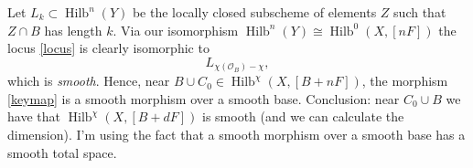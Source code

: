 \documentclass{amsart}
\theoremstyle{definition}
\renewcommand{\O}{\mathcal{O}}
\newcommand{\Hilb}{\operatorname{Hilb}}
\begin{document}
Let $L_k \subset \Hilb^n(Y)$ be the locally closed subscheme of elements $Z$ such that $Z \cap B$ has length $k$. Via our isomorphism $\Hilb^n(Y) \cong \Hilb^0(X,[nF])$ the locus \eqref{locus} is clearly isomorphic to 
$$
L_{\chi(\O_B) - \chi},
$$
which is \emph{smooth}. Hence, near $B \cup C_0 \in \Hilb^\chi(X,[B+nF])$, the morphism \eqref{keymap} is a smooth morphism over a smooth base. Conclusion: near $C_0 \cup B$ we have that $\Hilb^\chi(X,[B+dF])$ is smooth (and we can calculate the dimension). I'm using the fact that a smooth morphism over a smooth base has a smooth total space.

\begin{comment}

\pgfplotsset{ticks=none}

\begin{figure}
\centering
\begin{tikzpicture}
\begin{axis}
\addplot3+ [hide axis, domain=-5:5, samples=100, samples y=0,no marks, smooth,color=red,thick] ({-exp(-x^2)},{x},{0});
\addplot3+ [hide axis, domain=-5:5, samples=100, samples y=0,no marks, smooth,color=red,thick] ({-exp(-x^2)+5},{x},{0});
\addplot3+[hide axis, domain=-1.9:1.9, samples=100, samples y=0,no marks, smooth,color=red,thick] ({x^2-1+10},{x*(x^2-1)},{0});
\addplot3+[hide axis, domain=-1.9:1.9, samples=100, samples y=0,no marks, smooth,color=red,thick] ({x^2-1+15},{x*(x^2-1)},{0});
\addplot3+[hide axis, domain=-2:22, samples=100, samples y=0,no marks, smooth,color=red,thick] ({x},{-4},{0});
\addplot3 [mark=none,color=blue,thick] coordinates {(0,5,0) (2,5,0)};
\addplot3 [mark=none,color=blue,thick] coordinates {(0,5,1) (2,5,1)};
\addplot3 [mark=none,color=blue,thick] coordinates {(0,5,2) (1,5,2)};
\addplot3 [mark=none,color=blue,thick] coordinates {(0,5,0) (0,5,2)};
\addplot3 [mark=none,color=blue,thick] coordinates {(1,5,0) (1,5,2)};
\addplot3 [mark=none,color=blue,thick] coordinates {(2,5,0) (2,5,1)};
\addplot3 [mark=none,color=blue,thick] coordinates {(5,5,0) (7,5,0)};
\addplot3 [mark=none,color=blue,thick] coordinates {(5,5,1) (7,5,1)};
\addplot3 [mark=none,color=blue,thick] coordinates {(5,5,0) (5,5,1)};
\addplot3 [mark=none,color=blue,thick] coordinates {(6,5,0) (6,5,1)};
\addplot3 [mark=none,color=blue,thick] coordinates {(7,5,0) (7,5,1)};
\addplot3 [mark=none,color=blue,thick] coordinates {(12.5,5,0) (14.5,5,0)};
\addplot3 [mark=none,color=blue,thick] coordinates {(12.5,5,1) (14.5,5,1)};
\addplot3 [mark=none,color=blue,thick] coordinates {(12.5,5,2) (14.5,5,2)};

\end{comment}
\end{document}
